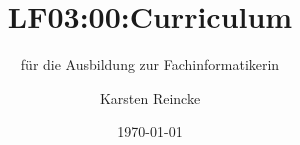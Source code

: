 \documentclass[]{beamer}
\title{LF03:00:Curriculum}
\subtitle{für die Ausbildung zur Fachinformatikerin}
\institute{GS-LDK}
\author{Karsten Reincke}
\date{\today}
\def\cfgGl{../../../cfg.gl/}
\begin{document}

\begin{frame}
  \titlepage
\end{frame}






\logo{}
\newpage



%
\end{document}

